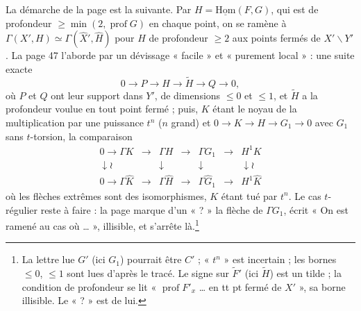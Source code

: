 \documentclass[11pt,a4paper]{article}
\begin{document}
La démarche de la page est la suivante. Par $H = \underline{\mathrm{Hom}}(F,
G)$, qui est de profondeur $\geq \min(2, \operatorname{prof} G)$ en chaque
point, on se ramène à
$\Gamma(X', H) \simeq \Gamma(\widehat{X}', \widehat{H})$ pour $H$ de profondeur
$\geq 2$ aux points fermés de $X' \smallsetminus Y'$. La page 47 l'aborde par
un dévissage « facile » et « purement local » : une suite exacte
\[
  0 \to P \to H \to \tilde{H} \to Q \to 0,
\]
où $P$ et $Q$ ont leur support dans $Y'$, de dimensions $\leq 0$ et
$\leq 1$, et $\tilde{H}$ a la profondeur voulue en tout point fermé ; puis, $K$ étant le noyau de la
multiplication par une puissance $t^n$ ($n$ grand) et
$0 \to K \to H \to G_1 \to 0$ avec
$G_1$ sans $t$-torsion, la comparaison
\[
\begin{array}{ccccccc}
  0 \to \Gamma K & \longrightarrow & \Gamma H & \longrightarrow & \Gamma G_1 & \longrightarrow & H^1 K \\
  \downarrow \wr & & \downarrow & & \downarrow & & \downarrow \wr \\
  0 \to \Gamma \widehat{K} & \longrightarrow & \Gamma \widehat{H} & \longrightarrow & \Gamma \widehat{G}_1 & \longrightarrow & H^1 \widehat{K}
\end{array}
\]
où les flèches extrêmes sont des isomorphismes, $K$ étant tué par $t^n$. Le
cas $t$-régulier reste à faire : la page marque d'un « ? » la flèche de
$\Gamma G_1$, écrit « On est ramené au cas où … », illisible, et s'arrête
là.\footnote{La lettre lue $G'$ (ici $G_1$) pourrait être $C'$ ; « $t^n$ » est
incertain ; les bornes $\leq 0$, $\leq 1$ sont lues d'après le tracé. Le signe
sur $\tilde{F}'$ (ici $\tilde{H}$) est un tilde ; la condition de profondeur
se lit « $\operatorname{prof} F'_x$ … en tt pt fermé de $X'$ », sa borne
illisible. Le « ? » est de lui.}
\end{document}

